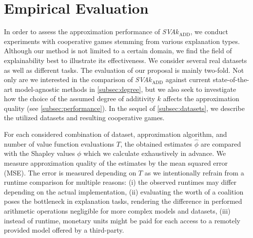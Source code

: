 \section{Empirical Evaluation}
\label{sec:exper}

In order to assess the approximation performance of \emph{SVA}$k_{\text{ADD}}$, we conduct experiments with cooperative games stemming from various explanation types.
Although our method is not limited to a certain domain, we find the field of explainability best to illustrate its effectiveness.
We consider several real datasets as well as different tasks.
The evaluation of our proposal is mainly two-fold.
Not only are we interested in the comparison of \emph{SVA}$k_{\text{ADD}}$ against current state-of-the-art model-agnostic methods in \cref{subsec:degree}, but we also seek to investigate how the choice of the assumed degree of additivity $k$ affects the approximation quality (see \cref{subsec:performance}).
In the sequel of \cref{subsec:datasets}, we describe the utilized datasets and resulting cooperative games.

For each considered combination of dataset, approximation algorithm, and number of value function evaluations $T$, the obtained estimates $\hat\phi$ are compared with the Shapley values $\phi$ which we calculate exhaustively in advance.
We measure approximation quality of the estimates by the mean squared error (MSE).
The error is measured depending on $T$ as we intentionally refrain from a runtime comparison for multiple reasons:
(i) the observed runtimes may differ depending on the actual implementation,
(ii) evaluating the worth of a coalition poses the bottleneck in explanation tasks, rendering the difference in performed arithmetic operations negligible for more complex models and datasets,
(iii) instead of runtime, monetary units might be paid for each access to a remotely provided model offered by a third-party.

